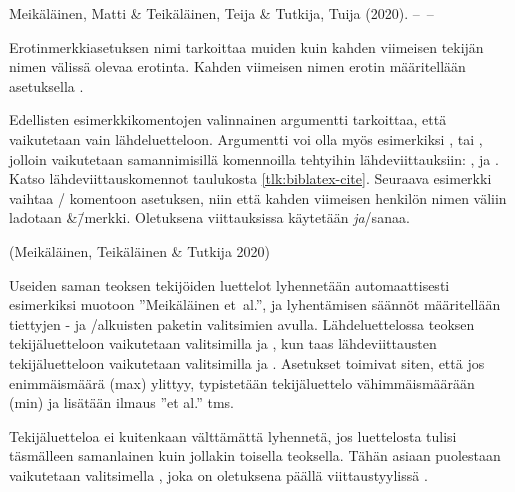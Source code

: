 \begin{koodilohkosis}
\end{koodilohkosis}

\begin{tulossis}
  Meikäläinen, Matti \& Teikäläinen, Teija \& Tutkija, Tuija (2020).
  --~--
\end{tulossis}

Erotinmerkkiasetuksen nimi  tarkoittaa muiden
kuin kahden viimeisen tekijän nimen välissä olevaa erotinta. Kahden
viimeisen nimen erotin määritellään asetuksella
.

Edellisten esimerkkikomentojen valinnainen argumentti 
tarkoittaa, että vaikutetaan vain lähdeluetteloon. Argumentti voi olla
myös esimerkiksi ,  tai ,
jolloin vaikutetaan samannimisillä komennoilla tehtyihin
lähdeviittauksiin: ,  ja
. Katso lähdeviittauskomennot taulukosta
\ref{tlk:biblatex-cite}. Seuraava esimerkki vaihtaa
\-/ komentoon asetuksen, niin että kahden viimeisen
henkilön nimen väliin ladotaan \&\=/merkki. Oletuksena viittauksissa
käytetään \textit{ja}\-/sanaa.

\begin{koodilohkosis}
\end{koodilohkosis}

\begin{tulossis}
  (Meikäläinen, Teikäläinen \& Tutkija 2020)
\end{tulossis}

Useiden saman teoksen tekijöiden luettelot lyhennetään automaattisesti
esimerkiksi muotoon ''Meikäläinen et~al.'', ja lyhentämisen säännöt
määritellään tiettyjen - ja \-/alkuisten paketin
valitsimien avulla. Lähdeluettelossa teoksen tekijäluetteloon
vaikutetaan valitsimilla  ja
, kun taas lähdeviittausten tekijäluetteloon
vaikutetaan valitsimilla  ja
. Asetukset toimivat siten, että jos
enimmäismäärä (max) ylittyy, typistetään tekijäluettelo vähimmäismäärään
(min) ja lisätään ilmaus ''et al.'' tms.

Tekijäluetteloa ei kuitenkaan välttämättä lyhennetä, jos luettelosta
tulisi täsmälleen samanlainen kuin jollakin toisella teoksella. Tähän
asiaan puolestaan vaikutetaan valitsimella , joka on
oletuksena päällä viittaustyylissä .

